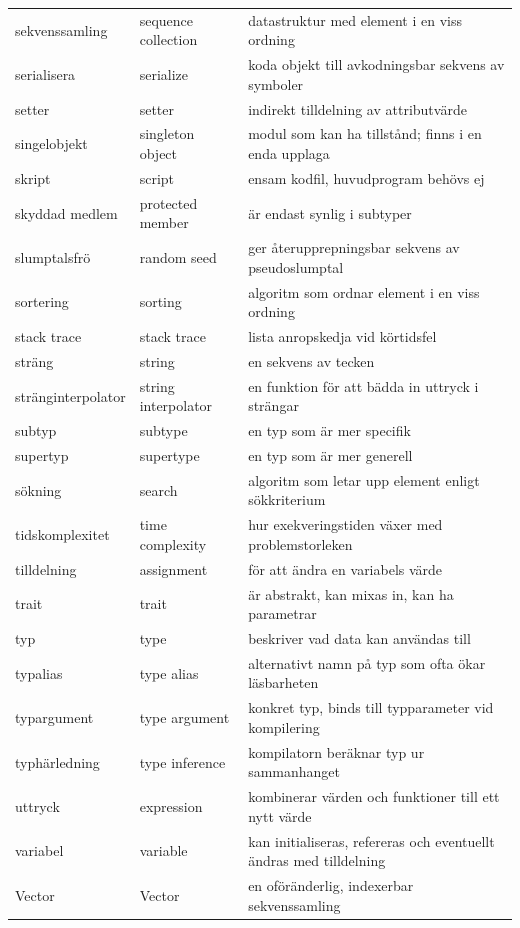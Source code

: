 \begin{tabular}{l|l|l}
sekvenssamling & sequence collection & datastruktur med element i en viss ordning \\
serialisera & serialize & koda objekt till avkodningsbar sekvens av symboler \\
setter & setter & indirekt tilldelning av attributvärde \\
singelobjekt & singleton object & modul som kan ha tillstånd; finns i en enda upplaga \\
skript & script & ensam kodfil, huvudprogram behövs ej \\
skyddad medlem & protected member & är endast synlig i subtyper \\
slumptalsfrö & random seed & ger återupprepningsbar sekvens av pseudoslumptal \\
sortering & sorting & algoritm som ordnar element i en viss ordning \\
stack trace & stack trace & lista anropskedja vid körtidsfel \\
sträng & string & en sekvens av tecken \\
stränginterpolator & string interpolator & en funktion för att bädda in uttryck i strängar \\
subtyp & subtype & en typ som är mer specifik \\
supertyp & supertype & en typ som är mer generell \\
sökning & search & algoritm som letar upp element enligt sökkriterium \\
tidskomplexitet & time complexity & hur exekveringstiden växer med problemstorleken \\
tilldelning & assignment & för att ändra en variabels värde \\
trait & trait & är abstrakt, kan mixas in, kan ha parametrar \\
typ & type & beskriver vad data kan användas till \\
typalias & type alias & alternativt namn på typ som ofta ökar läsbarheten \\
typargument & type argument & konkret typ, binds till typparameter vid kompilering \\
typhärledning & type inference & kompilatorn beräknar typ ur sammanhanget \\
uttryck & expression & kombinerar värden och funktioner till ett nytt värde \\
variabel & variable & kan initialiseras, refereras och eventuellt ändras med tilldelning \\
Vector & Vector & en oföränderlig, indexerbar sekvenssamling \\

\end{tabular}
